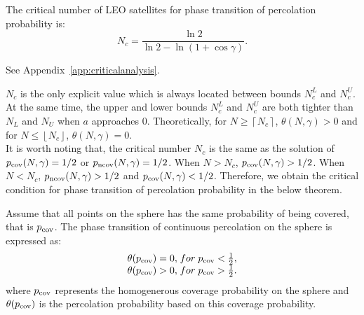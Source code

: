 \documentclass[final]{IEEEtran}
\begin{document}
\begin{lemma}
The critical number of LEO satellites for phase transition of percolation probability is:
\begin{equation}
N_c=\frac{\ln 2}{\ln 2-\ln(1+\cos\gamma)}.
\label{criticalNc}
\end{equation}
\label{lem:criticalanalysis}
\end{lemma}
\begin{IEEEproof}
See Appendix~\ref{app:criticalanalysis}. 
\end{IEEEproof}
$N_c$ is the only explicit value which is always located between bounds $N_c^{L}$ and $N_c^{U}$. At the same time, the upper and lower bounds $N_c^{L}$ and $N_c^{U}$ are both tighter than $N_L$ and $N_U$ when $a$ approaches 0. Theoretically, for $N\geq\left \lceil N_c \right \rceil$, $\theta(N,\gamma)>0$ and for $N\leq\left \lfloor N_c \right \rfloor$, $\theta(N,\gamma)=0$.\\
\indent It is worth noting that, the critical number $N_c$ is the same as the solution of $p_{\rm cov}(N,\gamma)=1/2$ or $p_{\rm ncov}(N,\gamma)=1/2$. When $N>N_c$, $ p_{\rm cov}(N,\gamma)>1/2$. When $N<N_c$, $p_{\rm ncov}(N,\gamma)>1/2$ and $p_{\rm cov}(N,\gamma)<1/2$. Therefore, we obtain the critical condition for phase transition of percolation probability in the below theorem.
\begin{theorem}
    Assume that all points on the sphere has the same probability of being covered, that is $p_{\rm cov}$. 
    The phase transition of continuous percolation on the sphere is expressed as:
\begin{equation}
\begin{array}{r@{}l}
    \theta(p_{\rm cov})=0,\;& for\;p_{\rm cov}<\frac{1}{2}, \\\theta(p_{\rm cov})>0,\;& for\;p_{\rm cov}>\frac{1}{2}. \\
    
\end{array}
\end{equation}
where $p_{\rm cov}$ represents the homogenerous coverage probability on the sphere and $\theta(p_{\rm cov})$ is the percolation probability based on this coverage probability.
\label{theo:perpro_covpro}
\end{theorem}
\end{document}
